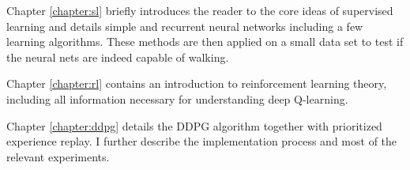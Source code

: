 Chapter \ref{chapter:sl} briefly introduces the reader to the core ideas of supervised learning and details simple and recurrent neural networks including a few learning algorithms. These methods are then applied on a small data set to test if the neural nets are indeed capable of walking.

Chapter \ref{chapter:rl} contains an introduction to  reinforcement learning theory, including all information necessary for understanding deep Q-learning.

Chapter \ref{chapter:ddpg} details the DDPG algorithm together with prioritized experience replay. I further describe the implementation process and most of the relevant experiments.







